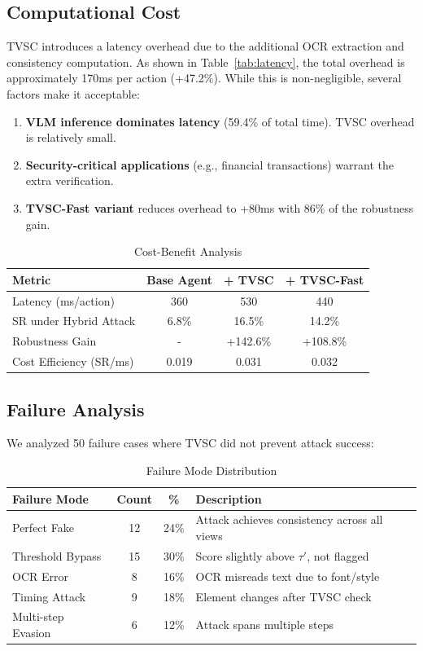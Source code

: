 \documentclass[runningheads]{llncs}
\begin{document}
\subsection{Computational Cost}

TVSC introduces a latency overhead due to the additional OCR extraction and consistency computation. As shown in Table~\ref{tab:latency}, the total overhead is approximately 170ms per action (+47.2\%). While this is non-negligible, several factors make it acceptable:
\begin{enumerate}
    \item \textbf{VLM inference dominates latency} (59.4\% of total time). TVSC overhead is relatively small.
    \item \textbf{Security-critical applications} (e.g., financial transactions) warrant the extra verification.
    \item \textbf{TVSC-Fast variant} reduces overhead to +80ms with 86\% of the robustness gain.
\end{enumerate}

\begin{table}[ht]
\caption{Cost-Benefit Analysis}
\centering
\begin{tabular}{|l|c|c|c|}
\hline
Metric & Base Agent & + TVSC & + TVSC-Fast \\
\hline
Latency (ms/action) & 360 & 530 & 440 \\
SR under Hybrid Attack & 6.8\% & 16.5\% & 14.2\% \\
Robustness Gain & - & +142.6\% & +108.8\% \\
Cost Efficiency (SR/ms) & 0.019 & 0.031 & 0.032 \\
\hline
\end{tabular}
\end{table}

\subsection{Failure Analysis}
We analyzed 50 failure cases where TVSC did not prevent attack success:

\begin{table}[ht]
\caption{Failure Mode Distribution}
\centering
\begin{tabular}{|l|c|c|l|}
\hline
Failure Mode & Count & \% & Description \\
\hline
Perfect Fake & 12 & 24\% & Attack achieves consistency across all views \\
Threshold Bypass & 15 & 30\% & Score slightly above $\tau'$, not flagged \\
OCR Error & 8 & 16\% & OCR misreads text due to font/style \\
Timing Attack & 9 & 18\% & Element changes after TVSC check \\
Multi-step Evasion & 6 & 12\% & Attack spans multiple steps \\
\hline
\end{tabular}
\end{table}
\end{document}
